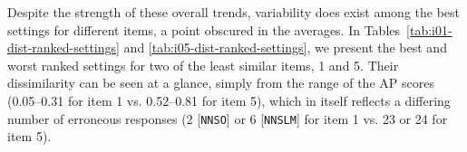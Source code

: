 \documentclass[11pt,letterpaper]{article}
\newcommand{\param}[1]{\texttt{#1}}
\renewcommand{\marginpar}[1]{}
\begin{document}




Despite the strength of these overall trends, variability
does exist among the best settings for different items, a point obscured
in the averages.  In Tables~\ref{tab:i01-dist-ranked-settings} and
\ref{tab:i05-dist-ranked-settings}, we present the best and worst
ranked settings for two of the least similar items, 1 and 5.
Their dissimilarity can be seen at a glance, simply from the range of
the AP scores (0.05--0.31 for item 1 vs. 0.52--0.81 for item 5), which
in itself reflects a differing number of erroneous responses (2 [\param{NNSO}]
or 6 [\param{NNSLM}] for item 1 vs. 23 or 24 for item 5).
\end{document}

